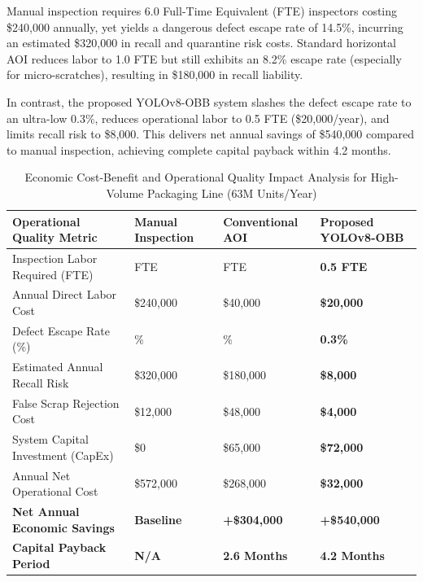 Manual inspection requires 6.0 Full-Time Equivalent (FTE) inspectors costing \$240,000 annually, yet yields a dangerous defect escape rate of 14.5\%, incurring an estimated \$320,000 in recall and quarantine risk costs. Standard horizontal AOI reduces labor to 1.0 FTE but still exhibits an 8.2\% escape rate (especially for micro-scratches), resulting in \$180,000 in recall liability.

In contrast, the proposed YOLOv8-OBB system slashes the defect escape rate to an ultra-low 0.3\%, reduces operational labor to 0.5 FTE (\$20,000/year), and limits recall risk to \$8,000. This delivers net annual savings of \$540,000 compared to manual inspection, achieving complete capital payback within 4.2 months.

\begin{table}[htbp]
\centering
\small\singlespacing
\setlength{\tabcolsep}{3.5pt}
\renewcommand{\arraystretch}{1.15}
\caption{Economic Cost-Benefit and Operational Quality Impact Analysis for High-Volume Packaging Line (63M Units/Year)}
\label{tab:roi}
\begin{tabularx}{\textwidth}{|>{\raggedright\arraybackslash}X|>{\centering\arraybackslash}p{2.8cm}|>{\centering\arraybackslash}p{2.8cm}|>{\centering\arraybackslash}p{3.2cm}|}
\hline
\textbf{Operational Quality Metric} & \textbf{Manual Inspection} & \textbf{Conventional AOI} & \textbf{Proposed YOLOv8-OBB}\\ \hline
Inspection Labor Required (FTE) & 6.0 FTE & 1.0 FTE & \textbf{0.5 FTE}\\ \hline
Annual Direct Labor Cost & \$240,000 & \$40,000 & \textbf{\$20,000}\\ \hline
Defect Escape Rate (\%) & 14.5\% & 8.2\% & \textbf{0.3\%}\\ \hline
Estimated Annual Recall Risk & \$320,000 & \$180,000 & \textbf{\$8,000}\\ \hline
False Scrap Rejection Cost & \$12,000 & \$48,000 & \textbf{\$4,000}\\ \hline
System Capital Investment (CapEx) & \$0 & \$65,000 & \textbf{\$72,000}\\ \hline
Annual Net Operational Cost & \$572,000 & \$268,000 & \textbf{\$32,000}\\ \hline
\textbf{Net Annual Economic Savings} & \textbf{Baseline} & \textbf{+\$304,000} & \textbf{+\$540,000}\\ \hline
\textbf{Capital Payback Period} & \textbf{N/A} & \textbf{2.6 Months} & \textbf{4.2 Months}\\ \hline
\end{tabularx}
\end{table}

